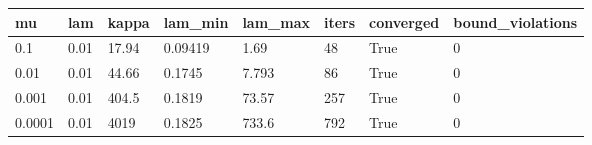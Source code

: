\begin{tabular}{llllllll}
\hline
mu & lam & kappa & lam\_min & lam\_max & iters & converged & bound\_violations \\
\hline
0.1 & 0.01 & 17.94 & 0.09419 & 1.69 & 48 & True & 0 \\
0.01 & 0.01 & 44.66 & 0.1745 & 7.793 & 86 & True & 0 \\
0.001 & 0.01 & 404.5 & 0.1819 & 73.57 & 257 & True & 0 \\
0.0001 & 0.01 & 4019 & 0.1825 & 733.6 & 792 & True & 0 \\
\hline
\end{tabular}
